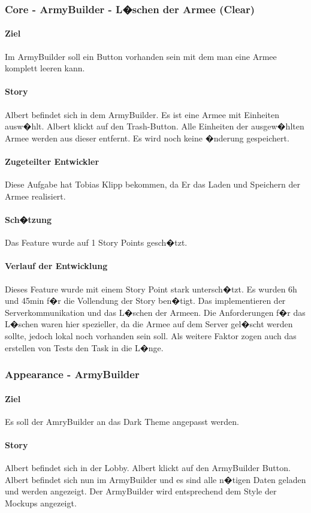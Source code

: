 \documentclass[12pt, titlepage]{scrartcl}
\begin{document}
			\subsubsection{Core - ArmyBuilder - L�schen der Armee (Clear)}
			\paragraph{Ziel} Im ArmyBuilder soll ein Button vorhanden sein mit dem man eine Armee komplett leeren kann.
			\paragraph{Story}Albert befindet sich in dem ArmyBuilder. Es ist eine Armee mit Einheiten ausw�hlt. Albert klickt auf den \glqq Trash-Button\grqq. Alle Einheiten der ausgew�hlten Armee werden aus dieser entfernt. Es wird noch keine �nderung gespeichert.
			\paragraph{Zugeteilter Entwickler} Diese Aufgabe hat Tobias Klipp bekommen, da Er das Laden und Speichern der Armee realisiert.
			\paragraph{Sch�tzung}
			Das Feature wurde auf 1 Story Points gesch�tzt.
			\paragraph{Verlauf der Entwicklung} 
			Dieses Feature wurde mit einem Story Point stark untersch�tzt. Es wurden 6h und 45min f�r die Vollendung der Story ben�tigt. Das implementieren der Serverkommunikation und das L�schen der Armeen. Die Anforderungen f�r das L�schen waren hier spezieller, da die Armee auf dem Server gel�scht werden sollte, jedoch lokal noch vorhanden sein soll. Als weitere Faktor zogen auch das erstellen von Tests den Task in die L�nge.
			
			\subsubsection{Appearance - ArmyBuilder}
			\paragraph{Ziel} Es soll der AmryBuilder an das Dark Theme angepasst werden.
			\paragraph{Story} Albert befindet sich in der Lobby. Albert klickt auf den ArmyBuilder Button. Albert befindet sich nun im ArmyBuilder und es sind alle n�tigen Daten geladen und werden angezeigt. Der ArmyBuilder wird entsprechend dem Style der Mockups angezeigt.
\end{document}
